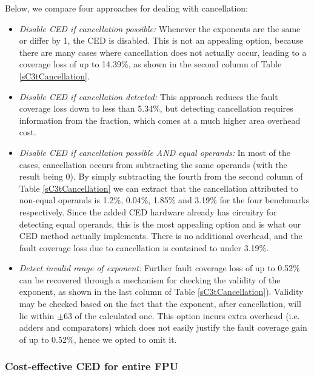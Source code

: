 \documentclass[12pt]{yalephd}
\begin{document}
Below, we compare four approaches for dealing with cancellation:

\begin{itemize}
\item {\em Disable CED if cancellation possible:} Whenever the exponents are the same or differ by 1, the CED is disabled. This is not an appealing option, because there are many cases where cancellation does not actually occur, leading to a coverage loss of up to 14.39\%, as shown in the second column of Table \ref{sC3tCancellation}.

\item {\em Disable CED if cancellation detected:} This approach reduces the fault coverage loss down to less than 5.34\%, but detecting cancellation requires information from the fraction, which comes at a much higher area overhead cost.

\item {\em Disable CED if cancellation possible AND equal operands:} In most of the cases, cancellation occurs from subtracting the same operands (with the result being 0). By simply subtracting the fourth from the second column of Table \ref{sC3tCancellation} we can extract that the cancellation attributed to non-equal operands is 1.2\%, 0.04\%, 1.85\% and 3.19\% for the four benchmarks respectively. Since the added CED hardware already has circuitry for detecting equal operands, this is the most appealing option and is what our CED method actually implements. There is no additional overhead, and the fault coverage loss due to cancellation is contained to under 3.19\%.
	
\item {\em Detect invalid range of exponent:} Further fault coverage loss of up to 0.52\% can be recovered through a mechanism for checking the validity of the exponent, as shown in the last column of Table \ref{sC3tCancellation}). Validity may be checked based on the fact that the exponent, after cancellation, will lie within $\pm 63$ of the calculated one. This option incurs extra overhead (i.e. adders and comparators) which does not easily justify the fault coverage gain of up to 0.52\%, hence we opted to omit it.
\end{itemize}

\subsubsection{Cost-effective CED for entire FPU}\label{sC3sEntireFPU}
\end{document}
